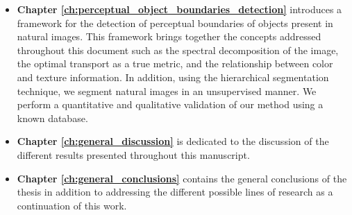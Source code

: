 \begin{itemize}
	\item \textbf{Chapter \ref{ch:perceptual_object_boundaries_detection}} introduces a framework for the detection of perceptual boundaries of objects present in natural images. This framework brings together the concepts addressed throughout this document such as the spectral decomposition of the image, the optimal transport as a true metric, and the relationship between color and texture information. In addition, using the hierarchical segmentation technique, we segment natural images in an unsupervised manner. We perform a quantitative and qualitative validation of our method using a known database.
	
	\item \textbf{Chapter \ref{ch:general_discussion}} is dedicated to the discussion of the different results presented throughout this manuscript.
	
	\item \textbf{Chapter \ref{ch:general_conclusions}} contains the general conclusions of the thesis in addition to addressing the different possible lines of research as a continuation of this work.
	
\end{itemize}